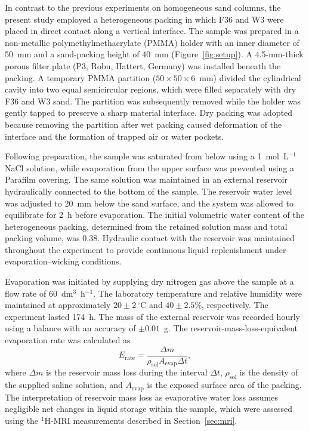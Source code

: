 \documentclass[final]{agujournal2019}
\newcommand{\HIso}{\ensuremath{^{1}\mathrm{H}}}
\begin{document}
In contrast to the previous experiments on homogeneous sand columns, the present
study employed a heterogeneous packing in which F36 and W3 were placed in direct
contact along a vertical interface. The sample was prepared in a non-metallic
polymethylmethacrylate (PMMA) holder with an inner diameter of 50~mm and a
sand-packing height of 40~mm (Figure~\ref{fig:setup}). A 4.5-mm-thick porous
filter plate (P3, Robu, Hattert, Germany) was installed beneath the packing. A
temporary PMMA partition ($50\times50\times6$~mm) divided the cylindrical cavity
into two equal semicircular regions, which were filled separately with dry F36
and W3 sand. The partition was subsequently removed while the holder was gently
tapped to preserve a sharp material interface. Dry packing was adopted because
removing the partition after wet packing caused deformation of the interface and
the formation of trapped air or water pockets.

Following preparation, the sample was saturated from below using a
1~mol~L$^{-1}$ NaCl solution, while evaporation from the upper surface was
prevented using a Parafilm covering. The same solution was maintained in an
external reservoir hydraulically connected to the bottom of the sample. The
reservoir water level was adjusted to 20~mm below the sand surface, and the
system was allowed to equilibrate for 2~h before evaporation. The initial
volumetric water content of the heterogeneous packing, determined from the
retained solution mass and total packing volume, was 0.38. Hydraulic contact
with the reservoir was maintained throughout the experiment to provide
continuous liquid replenishment under evaporation--wicking conditions.

Evaporation was initiated by supplying dry nitrogen gas above the sample at a
flow rate of 60~dm$^3$~h$^{-1}$. The laboratory temperature and relative
humidity were maintained at approximately $20\pm2\,^\circ$C and
$40\pm2.5$\%, respectively. The experiment lasted 174~h. The mass of the
external reservoir was recorded hourly using a balance with an accuracy of
$\pm0.01$~g. The reservoir-mass-loss-equivalent evaporation rate was calculated
as
\begin{equation}
E_{\mathrm{rate}} =
\frac{\Delta m}{\rho_{\mathrm{sol}} A_{\mathrm{evap}}\Delta t},
\label{eq:evaporation-rate}
\end{equation}
where $\Delta m$ is the reservoir mass loss during the interval $\Delta t$,
$\rho_{\mathrm{sol}}$ is the density of the supplied saline solution, and
$A_{\mathrm{evap}}$ is the exposed surface area of the packing. The
interpretation of reservoir mass loss as evaporative water loss assumes
negligible net changes in liquid storage within the sample, which were assessed
using the \HIso-MRI measurements described in Section~\ref{sec:mri}.
\end{document}
